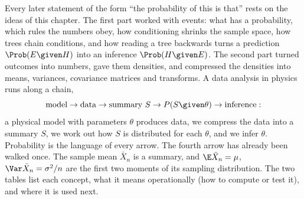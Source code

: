 Every later statement of the form ``the probability of this is that'' rests
on the ideas of this chapter. The first part worked with events:
what has a probability, which rules the numbers obey, how conditioning shrinks
the sample space, how trees chain conditions, and how reading a tree backwards
turns a prediction $\Prob(E\given H)$ into an inference $\Prob(H\given E)$. The
second part turned outcomes into numbers, gave them densities, and compressed
the densities into means, variances, covariance matrices and transforms.
A data analysis in physics runs along a chain,
\[
  \text{model}\to\text{data}\to\text{summary }S\to P(S\given\theta)\to\text{inference}:
\]
a physical model with parameters $\theta$ produces data, we compress the data
into a summary $S$, we work out how $S$ is distributed for each $\theta$, and
we infer $\theta$. Probability is the language of every arrow. The fourth
arrow has already been walked once. The sample mean $\bar X_n$ is a summary,
and $\E\bar X_n=\mu$, $\Var\bar X_n=\sigma^2/n$ are the first two moments of
its sampling distribution. The two tables list each concept, what it means
operationally (how to compute or test it), and where it is used next.

